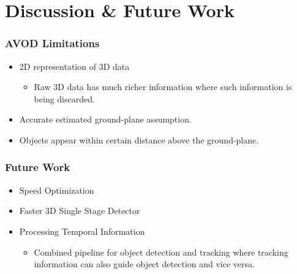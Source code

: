 \documentclass[10pt,fleqn,unknownkeysallowed]{beamer}
\begin{document}
\section{Discussion \& Future Work}
\begin{frame}
	\frametitle{AVOD Limitations}
	\linespread{1.5}
	\begin{itemize}
		\item{2D representation of 3D data}
		\begin{itemize}
			\item{Raw 3D data has much richer information where such information is being discarded.}
		\end{itemize}
		\item{Accurate estimated ground-plane assumption.}
		\item Objects appear within certain distance above the ground-plane.
	\end{itemize}
\end{frame}

\begin{frame}
	\frametitle{Future Work}
	\linespread{1.5}
	\begin{itemize}
		\item{Speed Optimization}
		\item{Faster 3D Single Stage Detector}
		\item{Processing Temporal Information}
		\begin{itemize}
			\item{Combined pipeline for object detection and tracking where tracking information can also guide object detection and vice versa.}
		\end{itemize}
	\end{itemize}
\end{frame}
\end{document}
